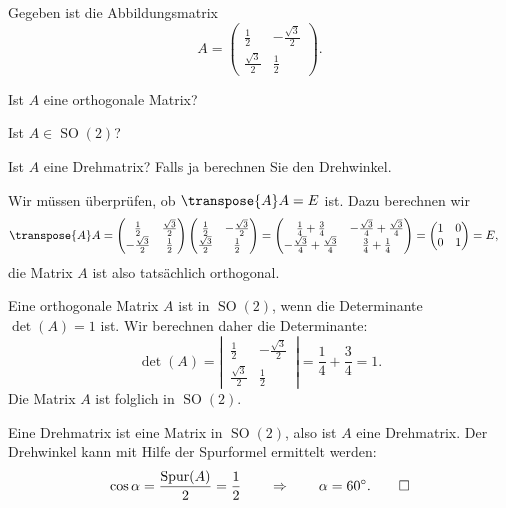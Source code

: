 Gegeben ist die Abbildungsmatrix
\[
A=\begin{pmatrix}
\frac12         &-\frac{\sqrt{3}}2\\
\frac{\sqrt{3}}2&\frac12
\end{pmatrix}.
\]
\begin{teilaufgaben}
\item
Ist $A$ eine orthogonale Matrix?
\item
Ist $A\in \operatorname{SO}(2)$?
\item
Ist $A$ eine Drehmatrix? Falls ja berechnen Sie den Drehwinkel.
\end{teilaufgaben}


\begin{loesung}
\begin{teilaufgaben}
\item Wir müssen überprüfen, ob $\transpose{A}A=E$ ist.
Dazu berechnen wir
\begin{align*}
\transpose{A}A
&=
\begin{pmatrix}
\frac12         &\frac{\sqrt{3}}2\\
-\frac{\sqrt{3}}2&\frac12
\end{pmatrix}
\begin{pmatrix}
\frac12         &-\frac{\sqrt{3}}2\\
\frac{\sqrt{3}}2&\frac12
\end{pmatrix}
=
\begin{pmatrix}
\frac14+\frac34&-\frac{\sqrt{3}}{4}+\frac{\sqrt{3}}{4}\\
-\frac{\sqrt{3}}{4}+\frac{\sqrt{3}}{4}&\frac34+\frac14
\end{pmatrix}
=
\begin{pmatrix}
1&0\\
0&1
\end{pmatrix}
=E,
\end{align*}
die Matrix $A$ ist also tatsächlich orthogonal.
\item
Eine orthogonale Matrix $A$ ist in $\operatorname{SO}(2)$, wenn die
Determinante $\det(A)=1$ ist.
Wir berechnen daher die Determinante:
\[
\det(A)
=
\left|\,\begin{matrix}
\frac12         &-\frac{\sqrt{3}}2\\
\frac{\sqrt{3}}2&\frac12
\end{matrix}\,\right|
=
\frac14+\frac34
=
1.
\]
Die Matrix $A$ ist folglich in $\operatorname{SO}(2)$.
\item
Eine Drehmatrix ist eine Matrix in $\operatorname{SO}(2)$, also ist
$A$ eine Drehmatrix. 
Der Drehwinkel kann mit Hilfe der Spurformel ermittelt werden:
\[
\cos \alpha
=
\frac{\operatorname{Spur}(A)}2
=
\frac12
\qquad\Rightarrow\qquad
\alpha = 60^\circ.
\qedhere
\]
\end{teilaufgaben}
\end{loesung}



